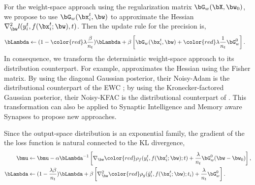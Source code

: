 For the weight-space approach using the regularization matrix $\bG_{w}(\bX, \bw_0)$, we propose to use $\bG_{w}(\bx_i^t, \bw)$ to approximate the Hessian $\nabla_{\bw}^2 l(y_i^t, f(\bx_i^t; \bw), t)$. Then the update rule for the precision is,
 \begin{align}
     \bLambda &\leftarrow  (1 - {\color{red}\lambda}\frac{\beta}{n_t}) \bLambda + \beta\left[\bG_{w}(\bx_i^t, \bw)+ {\color{red}\lambda}\frac{1} {n_t} \bG_{w}^0 \right].
\end{align}
In consequence, we transform the deterministic weight-space approach to its distribution counterpart. For example, \citet{zhang2017noisy} approximates the Hessian using the Fisher matrix. By using the diagonal Gaussian posterior, their Noisy-Adam is the distributional counterpart of the EWC \citep{kirkpatrick2017overcoming}; by using the Kronecker-factored Gaussian posterior, their Noisy-KFAC is the distributional counterpart of \citet{ritter2018online}. This transformation can also be applied to Synaptic Intelligence \citep{zenke2017continual} and Memory aware Synapses \citep{aljundi2018memory} to propose new approaches.

Since the output-space distribution is an exponential family, the gradient of the the loss function is natural connected to the KL divergence,
\begin{align}
    \bmu &\leftarrow \bmu - \alpha \bLambda^{-1}\left[\nabla_{\bw} {\color{red}\rho_f}(y_i^t, f(\bx_i^t; \bw); t) + \frac{\lambda}{n_t} \bG_{w}^0 (\bw - \bw_0) \right], \\
     \bLambda &\leftarrow  (1 - \frac{\lambda \beta}{n_t}) \bLambda + \beta\left[\nabla_{\bw}^2 {\color{red}\rho_g}(\tilde{y}_i^t, f(\bx_i^t; \bw); t_i) +\frac{\lambda} {n_t} \bG_{w}^0 \right].
\end{align}




